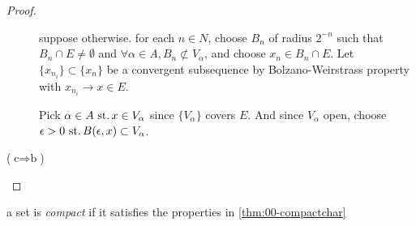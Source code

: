 \begin{proof}
\begin{description}
    suppose otherwise.  for each ${n\in N}$, choose $B_n$
    of radius $2^{-n}$ such that ${B_n\cap E\neq\emptyset}$
    and ${\forall\alpha\in A, B_n\not\subset V_\alpha}$,
    and choose ${x_n\in B_n\cap E}$.
    Let ${\{x_{n_i}\}\subset\{x_n\}}$ be a convergent subsequence
    by Bolzano-Weirstrass property with
    ${x_{n_i}\rightarrow x\in E}$.

    Pick ${\alpha\in A\operatorname{\,st.} x\in V_\alpha}$ since $\{V_\alpha\}$ covers $E$.
    And since $V_\alpha$ open, choose
    ${\epsilon>0\operatorname{\,st.} B(\epsilon, x)\subset V_\alpha}$.
  \item[(${\text{c}\Rightarrow\text{b}}$)]
  \end{description}
\end{proof}

\begin{defn}
  a set is \emph{compact} if it satisfies the properties
  in \ref{thm:00-compactchar}
\end{defn}
